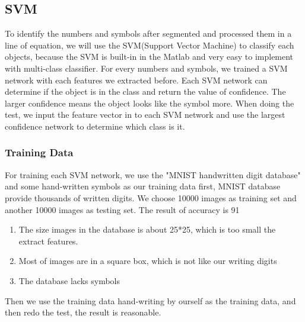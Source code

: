 \subsection{SVM}
To identify the numbers and symbols after segmented and processed them in a line of equation, we will use the SVM(Support Vector Machine) to classify each objects, because the SVM is built-in in the Matlab and very easy to implement with multi-class classifier. For every numbers and symbols, we trained a SVM network with each features we extracted before. Each SVM network can determine if the object is in the class and return the value of confidence. The larger confidence means the object looks like the symbol more. When doing the test, we input the feature vector in to each SVM network and use the largest confidence network to determine which class is it.
\subsubsection{Training Data}
For training each SVM network, we use the "MNIST handwritten digit database" and some hand-written symbols as our training data first, MNIST database provide thousands of written digits. We choose 10000 images as training set and another 10000 images as testing set. The result of accuracy is 91%
\begin{enumerate}
  \item The size images in the database is about 25*25, which is too small the extract features.
  \item Most of images are in a square box, which is not like our writing digits
  \item The database lacks symbols 
\end{enumerate}

Then we use the training data hand-writing by ourself as the training data, and then redo the test, the result is reasonable.
